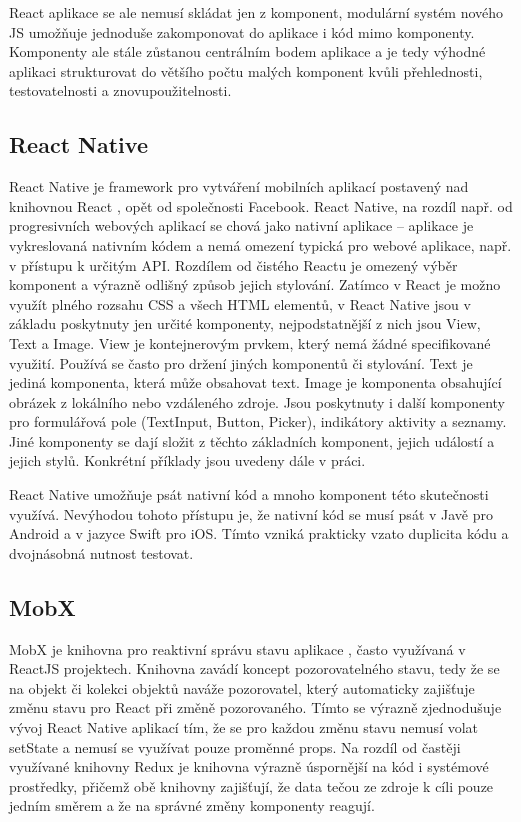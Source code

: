 React aplikace se ale nemusí skládat jen z komponent, modulární systém nového JS umožňuje jednoduše zakomponovat do aplikace i kód mimo komponenty. Komponenty ale stále zůstanou centrálním bodem aplikace a je tedy výhodné aplikaci strukturovat do většího počtu malých komponent kvůli přehlednosti, testovatelnosti a znovupoužitelnosti.

\subsection{React Native}

React Native je framework pro vytváření mobilních aplikací postavený nad knihovnou React \cite{novick2017react}, opět od společnosti Facebook. React Native, na rozdíl např. od progresivních webových aplikací se chová jako nativní aplikace -- aplikace je vykreslovaná nativním kódem a nemá omezení typická pro webové aplikace, např. v přístupu k určitým API. Rozdílem od čistého Reactu je omezený výběr komponent a výrazně odlišný způsob jejich stylování. Zatímco v React je možno využít plného rozsahu CSS a všech HTML elementů, v React Native jsou v základu poskytnuty jen určité komponenty, nejpodstatnější z nich jsou View, Text a Image. View je kontejnerovým prvkem, který nemá žádné specifikované využití. Používá se často pro držení jiných komponentů či stylování. Text je jediná komponenta, která může obsahovat text. Image je komponenta obsahující obrázek z lokálního nebo vzdáleného zdroje. Jsou poskytnuty i další komponenty pro formulářová pole (TextInput, Button, Picker), indikátory aktivity a seznamy. Jiné komponenty se dají složit z těchto základních komponent, jejich událostí a jejich stylů. Konkrétní příklady jsou uvedeny dále v práci. 

React Native umožňuje psát nativní kód a mnoho komponent této skutečnosti využívá. Nevýhodou tohoto přístupu je, že nativní kód se musí psát v Javě pro Android a v jazyce Swift pro iOS. Tímto vzniká prakticky vzato duplicita kódu a dvojnásobná nutnost testovat.

\subsection{MobX}

MobX je knihovna pro reaktivní správu stavu aplikace \cite{podila2018mobx}, často využívaná v ReactJS projektech. Knihovna zavádí koncept pozorovatelného stavu, tedy že se na objekt či kolekci objektů naváže pozorovatel, který automaticky zajišťuje změnu stavu pro React při změně pozorovaného. Tímto se výrazně zjednodušuje vývoj React Native aplikací tím, že se pro každou změnu stavu nemusí volat setState a nemusí se využívat pouze proměnné props. Na rozdíl od častěji využívané knihovny Redux je knihovna výrazně úspornější na kód i systémové prostředky, přičemž obě knihovny zajišťují, že data tečou ze zdroje k cíli pouze jedním směrem a že na správné změny komponenty reagují.


